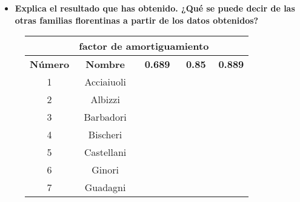 \newpage 
\begin{ejer}
    \begin{itemize}
        \item \textbf{Explica el resultado que has obtenido. ¿Qué se puede decir de las otras familias florentinas a partir de los datos obtenidos?}
    \end{itemize}
\end{ejer}
\begin{figure}[H]
    \centering
    \begin{tabular}{|c|c|c|c|c|}
        \hline
        \rowcolor{azul} \multicolumn{2}{|c|}{\textbf{Familia}}&\multicolumn{3}{c|}{\textbf{factor de amortiguamiento}} \\ \hline
        \rowcolor{azul} \textbf{Número} & \textbf{Nombre} & \textbf{0.689} & \textbf{0.85} & \textbf{0.889} \\ \hline
        1 & Acciaiuoli & \cellcolor{orange!25}{0.035479330884659266} & \cellcolor{orange!25}{0.030616772148504806} & \cellcolor{orange!25}{0.029570860773009678} \\ \hline
        2 & Albizzi & \cellcolor{blue!25}{0.07716802121188286} & \cellcolor{blue!25}{0.07626307878565806} & \cellcolor{blue!25}{0.0754079780067131} \\ \hline
        3 & Barbadori & \cellcolor{yellow!25}{0.051931088549229475} & \cellcolor{yellow!25}{0.05150657580871245} & \cellcolor{yellow!25}{0.05158376088937878} \\ \hline
        4 & Bischeri & \cellcolor{violet!25}{0.06922543274019202} & \cellcolor{violet!25}{0.07070219766081234} & \cellcolor{violet!25}{0.07079660905958886} \\ \hline
        5 & Castellani & \cellcolor{blue!25}{0.07163319737839043} & \cellcolor{blue!25}{0.0737287188007328} & \cellcolor{blue!25}{0.07428425236120793} \\ \hline
        6 & Ginori & \cellcolor{orange!25}{0.03803511605255818} & \cellcolor{orange!25}{0.031508862421612535} & \cellcolor{orange!25}{0.029691539730023933} \\ \hline
        7 & Guadagni & \cellcolor{blue!25}{0.08988386279832349} & \cellcolor{blue!25}{0.08877069919427012} & \cellcolor{blue!25}{0.08747508847562997} \\ \hline

\end{tabular}
\end{figure}
